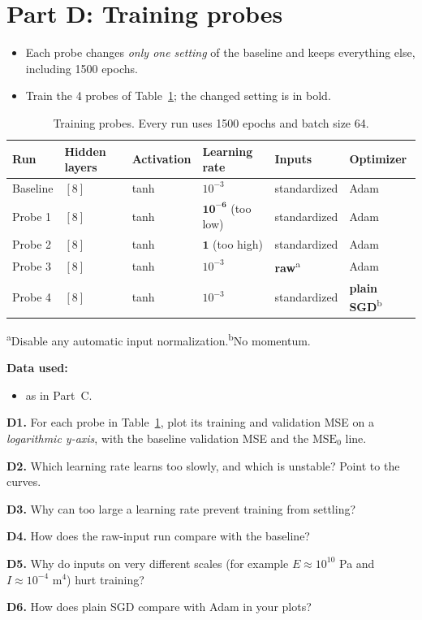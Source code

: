\documentclass[11pt]{article}
\newcommand{\question}[2]{\par\noindent\textbf{#1.} #2\par}
\newcommand{\datause}[1]{\par\smallskip\needspace{4\baselineskip}\noindent\textbf{Data used:}\nopagebreak\begin{itemize}#1\end{itemize}}
\begin{document}
\section*{Part D: Training probes}
\begin{itemize}
  \item \aitrap Each probe changes \emph{only one setting} of the baseline and keeps everything else, including 1500 epochs.
  \item Train the 4 probes of Table~\ref{tab:probes}; the changed setting is in bold.
\end{itemize}
\begin{table}[htbp]
\centering
\small
\begin{tabular}{@{}llllll@{}}
\toprule
Run & Hidden layers & Activation & Learning rate & Inputs & Optimizer \\
\midrule
Baseline & $[8]$ & tanh & $10^{-3}$ & standardized & Adam \\
Probe 1 & $[8]$ & tanh & $\mathbf{10^{-6}}$ (too low) & standardized & Adam \\
Probe 2 & $[8]$ & tanh & $\mathbf{1}$ (too high) & standardized & Adam \\
Probe 3 & $[8]$ & tanh & $10^{-3}$ & \textbf{raw}\textsuperscript{a} & Adam \\
Probe 4 & $[8]$ & tanh & $10^{-3}$ & standardized & \textbf{plain SGD}\textsuperscript{b} \\
\bottomrule
\end{tabular}

\smallskip
\footnotesize\textsuperscript{a}Disable any automatic input normalization.\quad\textsuperscript{b}No momentum.
\caption{Training probes. Every run uses 1500 epochs and batch size 64.}\label{tab:probes}
\end{table}
\datause{\item as in Part~C.}

\question{D1}{For each probe in Table~\ref{tab:probes}, plot its training and validation MSE on a \emph{logarithmic y-axis}, with the baseline validation MSE and the $\mathrm{MSE}_0$ line.}
\question{D2}{Which learning rate learns too slowly, and which is unstable? Point to the curves.}
\question{D3}{Why can too large a learning rate prevent training from settling?}
\question{D4}{How does the raw-input run compare with the baseline?}
\question{D5}{Why do inputs on very different scales (for example $E\approx10^{10}$ Pa and $I\approx10^{-4}$ m$^4$) hurt training?}
\question{D6}{How does plain SGD compare with Adam in your plots?}
\end{document}

